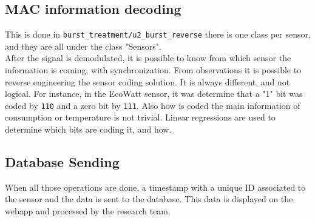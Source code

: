 \subsection{MAC information decoding}
This is done in \texttt{burst\_treatment/u2\_burst\_reverse} there is one class per sensor, and they are all under the class "Sensors".\\
After the signal is demodulated, it is possible to know from which sensor the information is coming, with synchronization.
From observations it is possible to reverse engineering the sensor coding solution. It is always different, and not logical. For instance, in the EcoWatt sensor, it was determine that a "1" bit was coded by \texttt{110} and a zero bit by \texttt{111}. Also how is coded the main information of consumption or temperature is not trivial. Linear regressions are used to determine which bits are coding it, and how.

\subsection{Database Sending}
When all those operations are done, a timestamp with a unique ID associated to the sensor and the data is sent to the database. This data is displayed on the webapp and processed by the research team.
